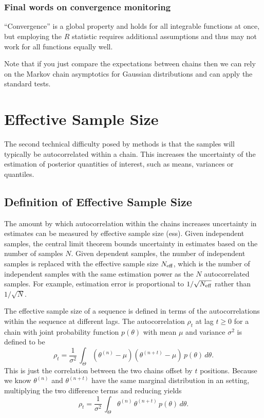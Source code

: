 \subsubsection{Final words on convergence monitoring}

``Convergence'' is a global property and holds for all integrable
functions at once, but employing the $\hat{R}$ statistic requires
additional assumptions and thus may not work for all functions equally
well.

Note that if you just compare the expectations between chains then we
can rely on the Markov chain asymptotics for Gaussian distributions
and can apply the standard tests.



\section{Effective Sample Size}\label{effective-sample-size.section}

The second technical difficulty posed by \MCMC methods is that the
samples will typically be autocorrelated within a chain.  This
increases the uncertainty of the estimation of posterior quantities of
interest, such as means, variances or quantiles.

\subsection{Definition of Effective Sample Size}

The amount by which autocorrelation within the chains increases
uncertainty in estimates can be measured by effective sample size
({\sc ess}).  Given independent samples, the central limit theorem
bounds uncertainty in estimates based on the number of samples $N$.
Given dependent samples, the number of independent samples is replaced
with the effective sample size $N_{\mbox{\scriptsize eff}}$, which is
the number of independent samples with the same estimation power as
the $N$ autocorrelated samples.  For example, estimation error is
proportional to $1/\sqrt{N_{\mbox{\scriptsize eff}}}$ rather than
$1/\sqrt{N}$.

The effective sample size of a sequence is defined in terms of the
autocorrelations within the sequence at different lags.  The
autocorrelation $\rho_t$ at lag $t \geq 0$ for a chain with joint
probability function $p(\theta)$ with mean $\mu$ and variance
$\sigma^2$ is defined to be
\[
\rho_t 
= 
\frac{1}{\sigma^2} \, \int_{\Theta} (\theta^{(n)} - \mu)
(\theta^{(n+t)} - \mu) \, p(\theta) \, d\theta.
\]
This is just the correlation between the two chains offset by $t$
positions.  Because we know $\theta^{(n)}$ and $\theta^{(n+t)}$ have
the same marginal distribution in an \MCMC setting, multiplying the
two difference terms and reducing yields
\[
\rho_t
= 
\frac{1}{\sigma^2} \, \int_{\Theta} \theta^{(n)} \, \theta^{(n+t)} \, p(\theta) \, d\theta.
\]

